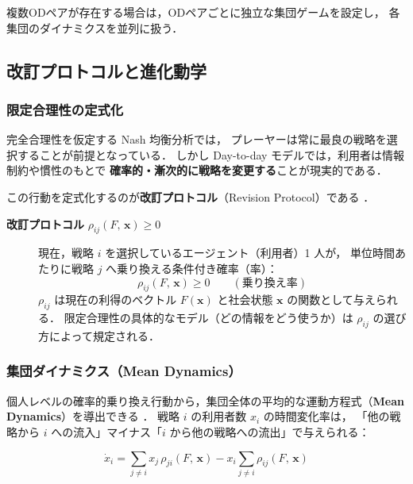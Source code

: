 複数ODペアが存在する場合は，ODペアごとに独立な集団ゲームを設定し，
各集団のダイナミクスを並列に扱う．

\subsection{改訂プロトコルと進化動学}
\label{subsec:revision-protocol}

\subsubsection*{限定合理性の定式化}

完全合理性を仮定する Nash 均衡分析では，
プレーヤーは常に最良の戦略を選択することが前提となっている．
しかし Day-to-day モデルでは，利用者は情報制約や慣性のもとで
\textbf{確率的・漸次的に戦略を変更する}ことが現実的である．

この行動を定式化するのが\textbf{改訂プロトコル}（Revision Protocol）である
\cite{Sandholm2010}．

\begin{description}
  \item[\textbf{改訂プロトコル} $\rho_{ij}(F,\, \boldsymbol{x}) \geq 0$]
    現在，戦略 $i$ を選択しているエージェント（利用者）1 人が，
    単位時間あたりに戦略 $j$ へ乗り換える条件付き確率（率）：
    \begin{equation}
      \rho_{ij}(F,\, \boldsymbol{x}) \geq 0
      \qquad (\text{乗り換え率})
      \label{eq:revision-protocol}
    \end{equation}
    $\rho_{ij}$ は現在の利得のベクトル $F(\boldsymbol{x})$ と社会状態 $\boldsymbol{x}$
    の関数として与えられる．
    限定合理性の具体的なモデル（どの情報をどう使うか）は
    $\rho_{ij}$ の選び方によって規定される．
\end{description}

\subsubsection*{集団ダイナミクス（Mean Dynamics）}

個人レベルの確率的乗り換え行動から，集団全体の平均的な運動方程式（\textbf{Mean Dynamics}）を導出できる
\cite{Sandholm2010}．
戦略 $i$ の利用者数 $x_i$ の時間変化率は，
「他の戦略から $i$ への流入」マイナス「$i$ から他の戦略への流出」で与えられる：

\begin{equation}
  \dot{x}_i
  = \sum_{j \neq i} x_j\, \rho_{ji}(F,\, \boldsymbol{x})
    - x_i \sum_{j \neq i} \rho_{ij}(F,\, \boldsymbol{x})
  \label{eq:mean-dynamics}
\end{equation}

